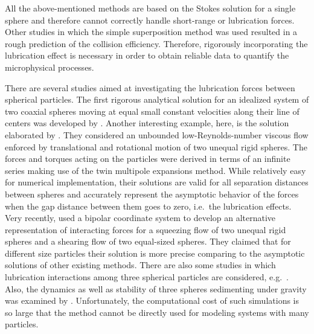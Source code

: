 \documentclass[../thesis.tex]{subfiles}
\begin{document}
All the above-mentioned methods are based on the Stokes solution for a single sphere and therefore cannot correctly handle short-range or lubrication forces. Other studies in which the simple superposition method was used \citep{SN63, SG71, LL75, PKS01} resulted in a rough prediction of the collision efficiency. Therefore, rigorously incorporating the lubrication effect is necessary in order to obtain reliable data to quantify the microphysical processes.

There are several studies aimed at investigating the lubrication forces between spherical particles. The first rigorous analytical solution for an idealized system of two coaxial spheres moving at equal small constant velocities along their line of centers was developed by \cite{SJ26}. Another interesting example, here, is the solution elaborated by \cite{JO84}. They considered an unbounded low-Reynolds-number viscous flow enforced by translational and rotational motion of two unequal rigid spheres. The forces and torques acting on the particles were derived in terms of an infinite series making use of the twin multipole expansions method. While relatively easy for numerical implementation, their solutions are valid for all separation distances between spheres and accurately represent the asymptotic behavior of the forces when the gap distance between them goes to zero, i.e.\ the lubrication effects. Very recently, \cite{GMS20} used a bipolar coordinate system to develop an alternative representation of interacting forces for a squeezing flow of two unequal rigid spheres and a shearing flow of two equal-sized spheres. They claimed that for different size particles their solution is more precise comparing to the asymptotic solutions of other existing methods. There are also some studies in which lubrication interactions among three spherical particles are considered, e.g.\ \cite{CEW99}. Also, the dynamics as well as stability of three spheres sedimenting under gravity was examined by \cite{EW06}. Unfortunately, the computational cost of such simulations is so large that the method cannot be directly used for modeling systems with many particles.
\end{document}
